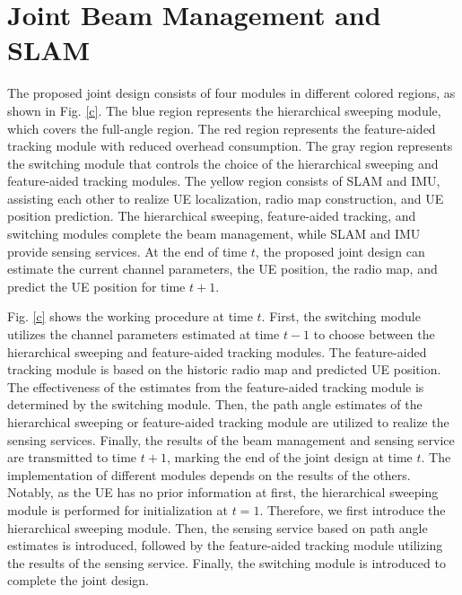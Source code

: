 \documentclass[journal,12pt,onecolumn,draftclsnofoot,]{IEEEtran}
\begin{document}
\section{Joint Beam Management and SLAM}
The proposed joint design consists of four modules in different colored regions, as shown in Fig. \ref{c}. 
The blue region represents the hierarchical sweeping module, which covers the full-angle region.
The red region represents the feature-aided tracking module with reduced overhead consumption. 
The gray region represents the switching module that controls the choice of the hierarchical sweeping and feature-aided tracking modules. 
The yellow region consists of SLAM and IMU, assisting each other to realize UE localization, radio map construction, and UE position prediction. 
The hierarchical sweeping, feature-aided tracking, and switching modules complete the beam management, while SLAM and IMU provide sensing services. 
At the end of time $t$, the proposed joint design can estimate the current channel parameters, the UE position, the radio map, and predict the UE position for time $t+1$.

Fig. \ref{c} shows the working procedure at time $t$. First, the switching module utilizes the channel parameters estimated at time $t-1$ to choose between the hierarchical sweeping and feature-aided tracking modules. 
The feature-aided tracking module is based on the historic radio map and predicted UE position. The effectiveness of the estimates from the feature-aided tracking module is determined by the switching module.
Then, the path angle estimates of the hierarchical sweeping or feature-aided tracking module are utilized to realize the sensing services. 
Finally, the results of the beam management and sensing service are transmitted to time $t+1$, marking the end of the joint design at time $t$. The implementation of different modules depends on the results of the others. 
Notably, as the UE has no prior information at first, the hierarchical sweeping module is performed for initialization at $t=1$. 
Therefore, we first introduce the hierarchical sweeping module. 
Then, the sensing service based on path angle estimates is introduced, followed by the feature-aided tracking module utilizing the results of the sensing service. 
Finally, the switching module is introduced to complete the joint design.



\vspace{-3.5mm}
\end{document}
